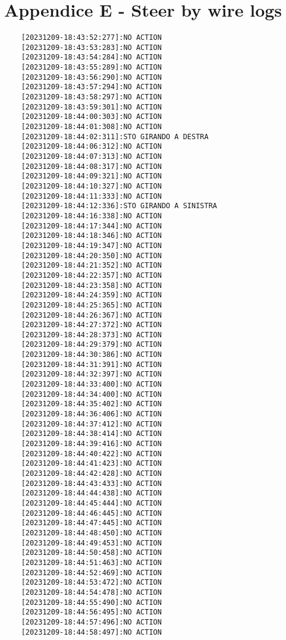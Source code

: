 \documentclass[12pt]{article}
\begin{document}
\section{Appendice E - Steer by wire logs}
\begin{verbatim}
    [20231209-18:43:52:277]:NO ACTION
    [20231209-18:43:53:283]:NO ACTION
    [20231209-18:43:54:284]:NO ACTION
    [20231209-18:43:55:289]:NO ACTION
    [20231209-18:43:56:290]:NO ACTION
    [20231209-18:43:57:294]:NO ACTION
    [20231209-18:43:58:297]:NO ACTION
    [20231209-18:43:59:301]:NO ACTION
    [20231209-18:44:00:303]:NO ACTION
    [20231209-18:44:01:308]:NO ACTION
    [20231209-18:44:02:311]:STO GIRANDO A DESTRA
    [20231209-18:44:06:312]:NO ACTION
    [20231209-18:44:07:313]:NO ACTION
    [20231209-18:44:08:317]:NO ACTION
    [20231209-18:44:09:321]:NO ACTION
    [20231209-18:44:10:327]:NO ACTION
    [20231209-18:44:11:333]:NO ACTION
    [20231209-18:44:12:336]:STO GIRANDO A SINISTRA
    [20231209-18:44:16:338]:NO ACTION
    [20231209-18:44:17:344]:NO ACTION
    [20231209-18:44:18:346]:NO ACTION
    [20231209-18:44:19:347]:NO ACTION
    [20231209-18:44:20:350]:NO ACTION
    [20231209-18:44:21:352]:NO ACTION
    [20231209-18:44:22:357]:NO ACTION
    [20231209-18:44:23:358]:NO ACTION
    [20231209-18:44:24:359]:NO ACTION
    [20231209-18:44:25:365]:NO ACTION
    [20231209-18:44:26:367]:NO ACTION
    [20231209-18:44:27:372]:NO ACTION
    [20231209-18:44:28:373]:NO ACTION
    [20231209-18:44:29:379]:NO ACTION
    [20231209-18:44:30:386]:NO ACTION
    [20231209-18:44:31:391]:NO ACTION
    [20231209-18:44:32:397]:NO ACTION
    [20231209-18:44:33:400]:NO ACTION
    [20231209-18:44:34:400]:NO ACTION
    [20231209-18:44:35:402]:NO ACTION
    [20231209-18:44:36:406]:NO ACTION
    [20231209-18:44:37:412]:NO ACTION
    [20231209-18:44:38:414]:NO ACTION
    [20231209-18:44:39:416]:NO ACTION
    [20231209-18:44:40:422]:NO ACTION
    [20231209-18:44:41:423]:NO ACTION
    [20231209-18:44:42:428]:NO ACTION
    [20231209-18:44:43:433]:NO ACTION
    [20231209-18:44:44:438]:NO ACTION
    [20231209-18:44:45:444]:NO ACTION
    [20231209-18:44:46:445]:NO ACTION
    [20231209-18:44:47:445]:NO ACTION
    [20231209-18:44:48:450]:NO ACTION
    [20231209-18:44:49:453]:NO ACTION
    [20231209-18:44:50:458]:NO ACTION
    [20231209-18:44:51:463]:NO ACTION
    [20231209-18:44:52:469]:NO ACTION
    [20231209-18:44:53:472]:NO ACTION
    [20231209-18:44:54:478]:NO ACTION
    [20231209-18:44:55:490]:NO ACTION
    [20231209-18:44:56:495]:NO ACTION
    [20231209-18:44:57:496]:NO ACTION
    [20231209-18:44:58:497]:NO ACTION

\end{verbatim}
\end{document}
